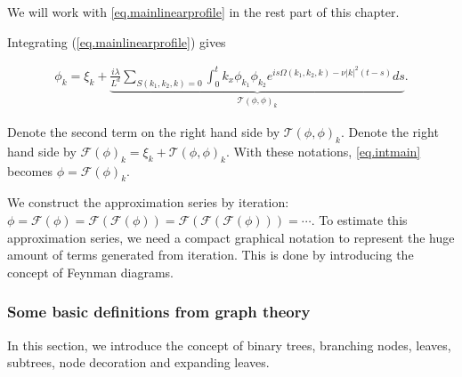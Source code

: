 We will work with \eqref{eq.mainlinearprofile} in the rest part of this chapter. 




Integrating (\ref{eq.mainlinearprofile}) gives

\begin{equation}\label{eq.intmain}
\begin{split}
    \phi_k =\xi_k+
    \underbrace{\frac{i\lambda}{L^{d}} \sum\limits_{S(k_1,k_2,k)=0}\int^{t}_0k_{x}\phi_{k_1} \phi_{k_2}e^{i s\Omega(k_1,k_2,k)- \nu|k|^2(t-s)} ds}_{\mathcal{T}(\phi,\phi)_k}.  
\end{split}
\end{equation}


Denote the second term on the right hand side by $\mathcal{T}(\phi,\phi)_k$. Denote the right hand side by $\mathcal{F}(\phi)_k=\xi_k+\mathcal{T}(\phi,\phi)_k$. With these notations, \eqref{eq.intmain} becomes  $\phi=\mathcal{F}(\phi)_k$. 

We construct the approximation series by iteration: $\phi=\mathcal{F}(\phi)=\mathcal{F}(\mathcal{F}(\phi))=\mathcal{F}(\mathcal{F}(\mathcal{F}(\phi)))=\cdots$. To estimate this approximation series, we need a compact graphical notation to represent the huge amount of terms generated from iteration. This is done by introducing the concept of Feynman diagrams.

\subsubsection{Some basic definitions from graph theory} In this section, we introduce the concept of binary trees, branching nodes, leaves, subtrees, node decoration
and expanding leaves.

